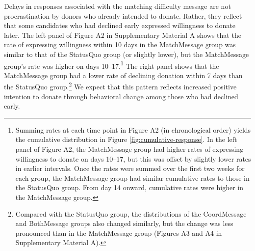 \documentclass[12pt, a4paper]{article}
\begin{document}
Delays in responses associated with the matching difficulty message are not procrastination by donors who already intended to donate. Rather, they reflect that some candidates who had declined early expressed willingness to donate later. The left panel of Figure A2 in Supplementary Material A shows that the rate of expressing willingness within 10 days in the MatchMessage group was similar to that of the StatusQuo group (or slightly lower), but the MatchMessage group's rate was higher on days 10--17.\footnote{Summing rates at each time point in Figure A2 (in chronological order) yields the cumulative distribution in Figure \ref{fig:cumulative-response}. In the left panel of Figure A2, the MatchMessage group had higher rates of expressing willingness to donate on days 10--17, but this was offset by slightly lower rates in earlier intervals. Once the rates were summed over the first two weeks for each group, the MatchMessage group had similar cumulative rates to those in the StatusQuo group. From day 14 onward, cumulative rates were higher in the MatchMessage group.} The right panel shows that the MatchMessage group had a lower rate of declining donation within 7 days than the StatusQuo group.\footnote{Compared with the StatusQuo group, the distributions of the CoordMessage and BothMessage groups also changed similarly, but the change was less pronounced than in the MatchMessage group (Figures A3 and A4 in Supplementary Material A).} We expect that this pattern reflects increased positive intention to donate through behavioral change among those who had declined early.
\end{document}
